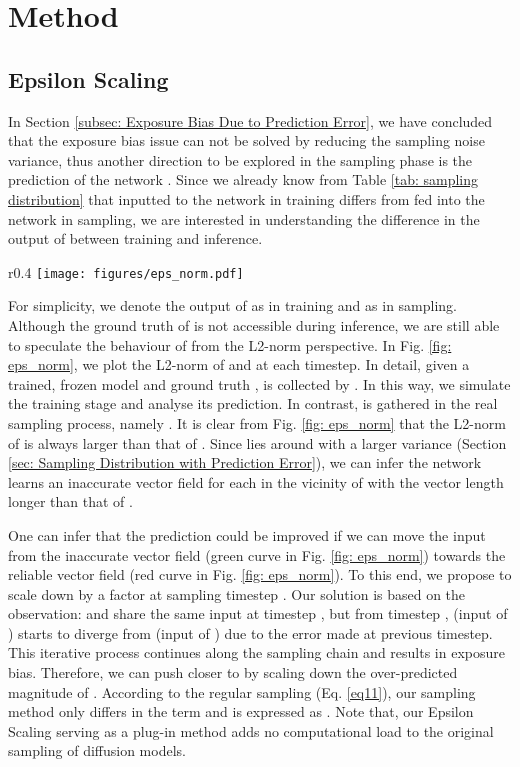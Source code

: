 \documentclass{article} \usepackage{iclr2024_conference,times}
\begin{document}
\section{Method}

\subsection{Epsilon Scaling}
In Section \ref{subsec: Exposure Bias Due to Prediction Error}, we have concluded that the exposure bias issue can not be solved by reducing the sampling noise variance, thus another direction to be explored in the sampling phase is the prediction of the network . Since we already know from Table \ref{tab: sampling distribution} that  inputted to the network  in training differs from  fed into the network  in sampling, we are interested in understanding the difference in the output of  between training and inference.

\begin{wrapfigure}{r}{0.4\textwidth}
\vskip -0.2in
  \texttt{[image: figures/eps\_norm.pdf]}
  \captionsetup{skip=2pt}
  \caption{ during training and sampling on CIFAR-10. We use 20-step sampling and report the L2-norm using 50k samples at each timestep.}
\label{fig: eps_norm}
\vskip -0.4in
\end{wrapfigure}

For simplicity, we denote the output of  as  in training and as  in sampling. Although the ground truth of  is not accessible during inference, we are still able to speculate the behaviour of  from the L2-norm perspective. 
In Fig. \ref{fig: eps_norm}, we plot the L2-norm of  and  at each timestep. In detail, given a trained, frozen model and ground truth ,  is collected by . In this way, we simulate the training stage and analyse its  prediction. In contrast,  is gathered in the real sampling process, namely . It is clear from Fig. \ref{fig: eps_norm} that the L2-norm of  is always larger than that of . Since  lies around  with a larger variance (Section \ref{sec: Sampling Distribution with Prediction Error}), we can infer the network learns an inaccurate vector field  for each  in the vicinity of  with the vector length longer than that of . 



One can infer that the prediction  could be improved if we can move the input  from the inaccurate vector field (green curve in Fig. \ref{fig: eps_norm}) towards the reliable vector field (red curve in Fig. \ref{fig: eps_norm}). To this end, we propose to scale down  by a factor  at sampling timestep . Our solution is based on the observation:  and  share the same input  at timestep , but from timestep ,  (input of ) starts to diverge from  (input of ) due to the  error made at previous timestep. This iterative process continues along the sampling chain and results in exposure bias. Therefore, we can push  closer to  by scaling down the over-predicted magnitude of . According to the regular sampling (Eq. \ref{eq11}), our sampling method only differs in the  term and is expressed as . Note that, our Epsilon Scaling serving as a plug-in method adds no computational load to the original sampling of diffusion models.
\end{document}
